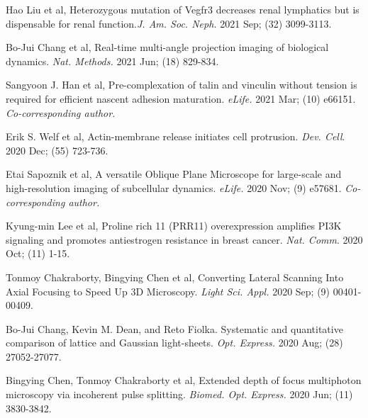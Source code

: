\begin{etaremune}
\item Hao Liu et al, Heterozygous mutation of Vegfr3 decreases renal lymphatics but is dispensable for renal function.{\it J. Am. Soc. Neph.} 2021 Sep; (32) 3099-3113.

\item Bo-Jui Chang et al, Real-time multi-angle projection imaging of biological dynamics. {\it Nat. Methods.} 2021 Jun; (18) 829-834.

\item Sangyoon J. Han et al, Pre-complexation of talin and vinculin without tension is required for efficient nascent adhesion maturation. {\it eLife.} 2021 Mar; (10) e66151. {\it Co-corresponding author.}

\item Erik S. Welf et al, Actin-membrane release initiates cell protrusion.  {\it Dev. Cell}. 2020 Dec; (55) 723-736.

\item  Etai Sapoznik et al, A versatile Oblique Plane Microscope for large-scale and high-resolution imaging of subcellular dynamics.  {\it eLife.} 2020 Nov; (9) e57681. {\it Co-corresponding author.}

\item Kyung-min Lee et al, Proline rich 11 (PRR11) overexpression amplifies PI3K signaling and promotes antiestrogen resistance in breast cancer. {\it Nat. Comm}. 2020 Oct; (11) 1-15.

\item Tonmoy Chakraborty, Bingying Chen et al, Converting Lateral Scanning Into Axial Focusing to Speed Up 3D Microscopy. {\it Light Sci. Appl.} 2020 Sep; (9) 00401-00409.

\item Bo-Jui Chang, Kevin M. Dean, and Reto Fiolka.  Systematic and quantitative comparison of lattice and Gaussian light-sheets.  {\it Opt. Express.} 2020 Aug; (28) 27052-27077.

\item Bingying Chen, Tonmoy Chakraborty et al,  Extended depth of focus multiphoton microscopy via incoherent pulse splitting. {\it Biomed. Opt. Express.} 2020 Jun; (11) 3830-3842.


\end{etaremune}
